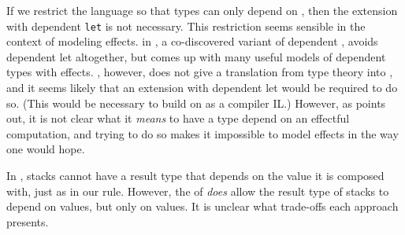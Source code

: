 If we restrict the language so that types can only depend on
\emph{}, then the extension with dependent \texttt{let} is not
necessary.
This restriction seems sensible in the context of modeling effects.
\citet{ahman2017:dissertation} in , a co-discovered variant of
dependent , avoids dependent let altogether, but comes up with many
useful models of dependent types with effects.
\citet{ahman2017:dissertation}, however, does not give a translation from type
theory into , and it seems likely that an extension with dependent
let would be required to do so.
(This would be necessary to build on  as a compiler IL.)
However, as \citet{vakar2017:dissertation} points out, it is not clear what it
\emph{means} to have a type depend on an effectful computation, and trying to do
so makes it impossible to model effects in  the way one would hope.

In , stacks cannot have a result type that depends on the value it
is composed with, just as in our  rule.
However, the  of \citet{vakar2017:dissertation} \emph{does} allow
the result type of stacks to depend on values, but only on values.
It is unclear what trade-offs each approach presents.
